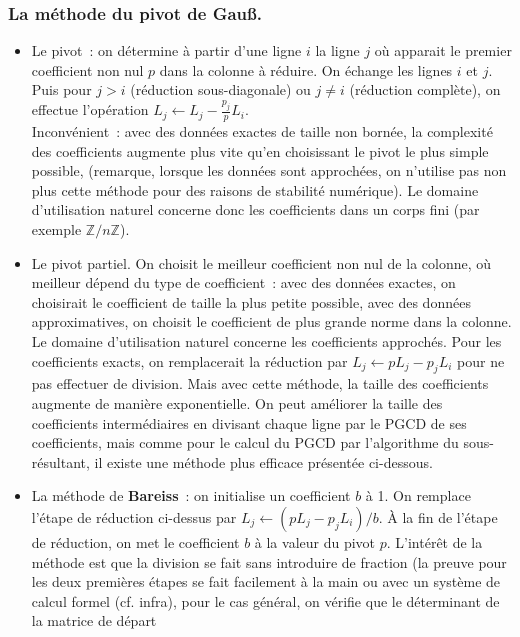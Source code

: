 \documentclass[a4paper,11pt]{article}
\newcommand{\Z}{{\mathbb{Z}}}
\begin{document}
\begin{giacjshere}
\subsubsection{La m\'ethode du pivot de Gau\ss.} 
\begin{itemize}
\item Le pivot~: on détermine à partir d'une ligne $i$ 
la ligne $j$ où apparait le premier coefficient non nul $p$ dans
la colonne à réduire. On échange les lignes
$i$ et $j$. Puis pour $j>i$ (réduction sous-diagonale)
ou $j\neq i$ (réduction complète), on effectue l'opération
$L_j \leftarrow L_j - \frac{p_j}{p}L_i$.\\
Inconv\'enient~: avec des donn\'ees exactes de taille non born\'ee, 
la complexité des coefficients augmente plus vite qu'en choisissant 
le pivot le plus simple possible, (remarque, lorsque les donn\'ees 
sont approch\'ees, on n'utilise pas non plus cette méthode
pour des raisons de stabilit\'e num\'erique).
Le domaine d'utilisation naturel concerne donc les coefficients
dans un corps fini (par exemple $\Z/n\Z$).
\item Le pivot partiel. On choisit le meilleur coefficient non nul de la
colonne, où meilleur dépend du type de coefficient~: avec des données
exactes, on choisirait le coefficient de taille la plus petite possible,
avec des donn\'ees approximatives, on choisit
le coefficient de plus grande norme dans la colonne.
Le domaine d'utilisation naturel concerne les coefficients
approch\'es. Pour les coefficients exacts, on remplacerait la
réduction par $L_j \leftarrow pL_j -p_j L_i$ pour ne pas effectuer
de division. Mais avec cette méthode, la taille des coefficients
augmente de manière exponentielle. On peut améliorer
la taille des coefficients intermédiaires en divisant chaque
ligne par le PGCD de ses coefficients, mais comme pour le
calcul du PGCD par l'algorithme du sous-résultant, il existe
une méthode plus efficace présentée ci-dessous.
\item La m\'ethode de {\bf Bareiss}~: on initialise un coefficient $b$ \`a 1.
On remplace l'\'etape de r\'eduction ci-dessus
par $L_j \leftarrow (pL_j -p_j L_i)/b$.
\`A la fin de l'\'etape de r\'eduction, on met le coefficient $b$
\`a la valeur du pivot $p$. L'intérêt de la méthode est que la division
se fait sans introduire de fraction (la preuve pour les deux premi\`eres
\'etapes se fait facilement \`a la main ou avec
un système de calcul formel (cf. infra), pour le cas g\'en\'eral, on v\'erifie
que le d\'eterminant de la matrice de d\'epart

\end{itemize}
\end{giacjshere}
\end{document}
